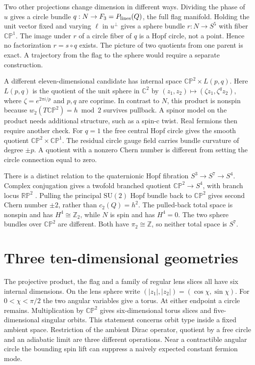 \documentclass[11pt,oneside]{article}
\newcommand{\C}{\mathbb C}
\newcommand{\Z}{\mathbb Z}
\newcommand{\CP}{\mathbb{CP}}
\newcommand{\SU}{\mathrm{SU}}
\begin{document}
Two other projections change dimension in different ways. Dividing the phase of \(u\) gives a circle bundle \(q:N\to F_3=P_{\rm lines}(Q)\), the full flag manifold. Holding the unit vector fixed and varying \(\ell\) in \(u^\perp\) gives a sphere bundle \(r:N\to S^5\) with fiber \(\CP^1\). The image under \(r\) of a circle fiber of \(q\) is a Hopf circle, not a point. Hence no factorization \(r=s\circ q\) exists. The picture of two quotients from one parent is exact. A trajectory from the flag to the sphere would require a separate construction.

A different eleven-dimensional candidate has internal space \(\CP^2\times L(p,q)\). Here \(L(p,q)\) is the quotient of the unit sphere in \(\C^2\) by \((z_1,z_2)\mapsto (\zeta z_1,\zeta^qz_2)\), where \(\zeta=e^{2\pi i/p}\) and \(p,q\) are coprime. In contrast to \(N\), this product is nonspin because \(w_2(T\CP^2)=h\bmod 2\) survives pullback. A spinor model on the product needs additional structure, such as a spin-c twist. Real fermions then require another check. For \(q=1\) the free central Hopf circle gives the smooth quotient \(\CP^2\times\CP^1\). The residual circle gauge field carries bundle curvature of degree \(\pm p\). A quotient with a nonzero Chern number is different from setting the circle connection equal to zero.

There is a distinct relation to the quaternionic Hopf fibration \(S^3\to S^7\to S^4\). Complex conjugation gives a twofold branched quotient \(\CP^2\to S^4\), with branch locus \(\mathbb{RP}^2\) \cite{massey}. Pulling the principal \(\SU(2)\) Hopf bundle back to \(\CP^2\) gives second Chern number \(\pm2\), rather than \(c_2(Q)=h^2\). The pulled-back total space is nonspin and has \(H^4\cong\Z_2\), while \(N\) is spin and has \(H^4=0\). The two sphere bundles over \(\CP^2\) are different. Both have \(\pi_2\cong\Z\), so neither total space is \(S^7\).

\section{Three ten-dimensional geometries}
The projective product, the flag and a family of regular lens slices all have six internal dimensions. On the lens sphere write \((|z_1|,|z_2|)=(\cos\chi,\sin\chi)\). For \(0<\chi<\pi/2\) the two angular variables give a torus. At either endpoint a circle remains. Multiplication by \(\CP^2\) gives six-dimensional torus slices and five-dimensional singular orbits. This statement concerns orbit type inside a fixed ambient space. Restriction of the ambient Dirac operator, quotient by a free circle and an adiabatic limit are three different operations. Near a contractible angular circle the bounding spin lift can suppress a naively expected constant fermion mode.
\end{document}
